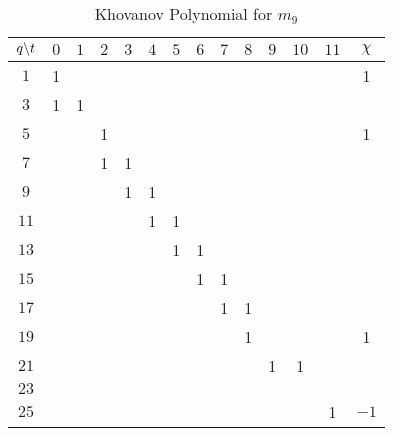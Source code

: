     \begin{table}
        \centering
        \begin{tabular}{| c | c | c | c | c | c | c | c | c | c | c | c | c | c |}
            \hline
            $q\symbol{92}t$&$0$&$1$&$2$&$3$&$4$&$5$&$6$&$7$&$8$&$9$&$10$&$11$&$\chi$\\
            \hline
            $1$&1&&&&&&&&&&&&1\\
            \hline
            $3$&1&1&&&&&&&&&&&\\
            \hline
            $5$&&&1&&&&&&&&&&1\\
            \hline
            $7$&&&1&1&&&&&&&&&\\
            \hline
            $9$&&&&1&1&&&&&&&&\\
            \hline
            $11$&&&&&1&1&&&&&&&\\
            \hline
            $13$&&&&&&1&1&&&&&&\\
            \hline
            $15$&&&&&&&1&1&&&&&\\
            \hline
            $17$&&&&&&&&1&1&&&&\\
            \hline
            $19$&&&&&&&&&1&&&&1\\
            \hline
            $21$&&&&&&&&&&1&1&&\\
            \hline
            $23$&&&&&&&&&&&&&\\
            \hline
            $25$&&&&&&&&&&&&1&$-1$\\
            \hline
        \end{tabular}
        \caption{Khovanov Polynomial for $m_{9}$}
        \label{table:m_9_kho}
    \end{table}
